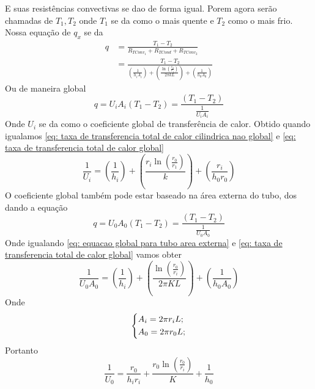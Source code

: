 E suas resistências convectivas se dao de forma igual. Porem agora serão chamadas de \(T_1, T_2\)
onde \(T_1\) se da como o mais quente e \(T_2\) como o mais frio. Nossa equação de \(q_x\) se da
\begin{align}\label{eq: taxa de transferencia total de calor cilindrica nao global}
    q &= \frac{T_1 - T_2}{R_{TConv_1} + R_{TCond} + R_{TConv_2}}\\
    &= \frac{T_1 - T_2}{\left(\frac{1}{h_i A_i}\right) + \left(\frac{\ln \left(\frac{r_0}{r_1} \right)}{2\pi k L}\right) + \left(\frac{1}{h_0 A_0}\right)}
\end{align}
Ou de maneira global
\begin{equation}\label{eq: taxa de transferencia total de calor global}
    q = U_i A_i \left(T_1 - T_2\right) = \frac{\left(T_1 - T_2\right)}{\frac{1}{U_i A_i}} 
\end{equation}
Onde \(U_i\) se da como o coeficiente global de transferência de calor. Obtido quando igualamos
\eqref{eq: taxa de transferencia total de calor cilindrica nao global} e \eqref{eq: taxa de transferencia total de calor global}
\begin{equation}
    \frac{1}{U_i} = \left(\frac{1}{h_i}\right) + \left(\frac{r_i \ln \left(\frac{r_0}{r_1} \right)}{k}\right) + \left(\frac{r_i}{h_0r_0}\right)
\end{equation}
O coeficiente global também pode estar baseado na área externa do tubo, dos dando a equação
\begin{equation}\label{eq: equacao global para tubo area externa}
    q = U_0 A_0 \left(T_1 - T_2\right) = \frac{\left(T_1 - T_2\right)}{\frac{1}{U_0 A_0}}
\end{equation}
Onde igualando \eqref{eq: equacao global para tubo area externa} e \eqref{eq: taxa de transferencia
total de calor global} vamos obter
\begin{equation}
    \frac{1}{U_0 A_0} = \left(\frac{1}{h_i}\right) + \left(\frac{\ln \left( \frac{r_0}{r_i} \right) }{2 \pi K L}\right) + \left(\frac{1}{h_0 A_0}\right)
\end{equation}
Onde 
\begin{equation}
    \begin{dcases}
        A_i = 2 \pi r_i L ;\\
        A_0 = 2\pi r_0 L  ;\\
    \end{dcases}
\end{equation}
Portanto
\begin{equation}
    \frac{1}{U_0} = \frac{r_0}{h_{i} r_{i} } + \frac{r_0 \ln \left( \frac{r_0}{r_i} \right)}{K} + \frac{1}{h_0}
\end{equation}
